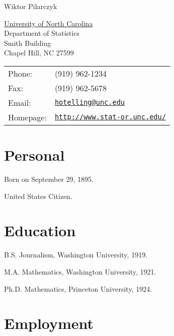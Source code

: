 \documentclass{article}
\def\name{Wiktor Pilarczyk}
\renewenvironment{itemize}{
  \begin{list}{}{
    \setlength{\leftmargin}{1.5em}
  }
}{
  \end{list}
}
\begin{document}
{\huge \name}


\vspace{0.25in}

\begin{minipage}{0.45\linewidth}
  \href{http://www.unc.edu/}{University of North Carolina} \\
  Department of Statistics \\
  Smith Building \\
  Chapel Hill, NC 27599
\end{minipage}
\begin{minipage}{0.45\linewidth}
  \begin{tabular}{ll}
    Phone: & (919) 962-1234 \\
    Fax: &  (919) 962-5678 \\
    Email: & \href{mailto:hotelling@unc.edu}{\tt hotelling@unc.edu} \\
    Homepage: & \href{http://www.stat-or.unc.edu/}{\tt http://www.stat-or.unc.edu/} \\
  \end{tabular}
\end{minipage}


\section*{Personal}

\begin{itemize}
\item Born on September 29, 1895.
\item United States Citizen.
\end{itemize}


\section*{Education}

\begin{itemize}
  \item B.S. Journalism, Washington University, 1919.

  \item M.A. Mathematics, Washington University, 1921.

  \item Ph.D. Mathematics, Princeton University, 1924.
\end{itemize}


\section*{Employment}
\end{document}
